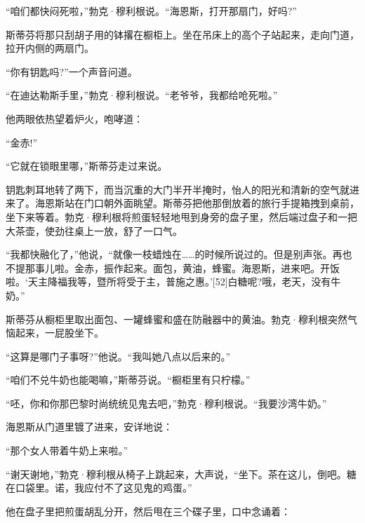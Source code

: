 \documentclass{article}
\begin{document}
“咱们都快闷死啦，”勃克·穆利根说。“海恩斯，打开那扇门，好吗?”



斯蒂芬将那只刮胡子用的钵撂在橱柜上。坐在吊床上的高个子站起来，走向门道，拉开内侧的两扇门。



“你有钥匙吗?”一个声音问道。



“在迪达勒斯手里，”勃克·穆利根说。“老爷爷，我都给呛死啦。”



他两眼依热望着炉火，咆哮道：



“金赤!”



“它就在锁眼里哪，”斯蒂芬走过来说。



钥匙刺耳地转了两下，而当沉重的大门半开半掩时，怡人的阳光和清新的空气就进来了。海恩斯站在门口朝外面眺望。斯蒂芬把他那倒放着的旅行手提箱拽到桌前，坐下来等着。勃克·穆利根将煎蛋轻轻地甩到身旁的盘子里，然后端过盘子和一把大茶壶，使劲往桌上一放，舒了一口气。



“我都快融化了，”他说，“就像一枝蜡烛在……的时候所说过的。但是别声张。再也不提那事儿啦。金赤，振作起来。面包，黄油，蜂蜜。海恩斯，进来吧。开饭啦。‘天主降福我等，暨所将受于主，普施之惠。’[52]白糖呢?哦，老天，没有牛奶。”



斯蒂芬从橱柜里取出面包、一罐蜂蜜和盛在防融器中的黄油。勃克·穆利根突然气恼起来，一屁股坐下。



“这算是哪门子事呀?”他说。“我叫她八点以后来的。”



“咱们不兑牛奶也能喝嘛，”斯蒂芬说。“橱柜里有只柠檬。”



“呸，你和你那巴黎时尚统统见鬼去吧，”勃克·穆利根说。“我要沙湾牛奶。”



海恩斯从门道里镀了进来，安详地说：



“那个女人带着牛奶上来啦。”



“谢天谢地，”勃克·穆利根从椅子上跳起来，大声说，“坐下。茶在这儿，倒吧。糖在口袋里。诺，我应付不了这见鬼的鸡蛋。”



他在盘子里把煎蛋胡乱分开，然后甩在三个碟子里，口中念诵着：
\end{document}
